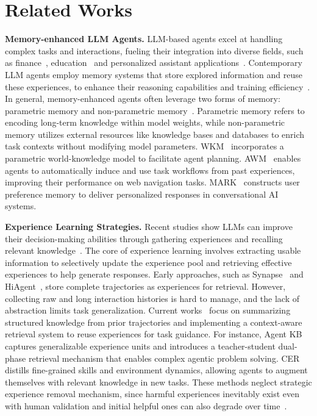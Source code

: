 \documentclass[11pt]{article}
\begin{document}
\section{Related Works}
\textbf{Memory-enhanced LLM Agents.} 
LLM-based agents excel at handling complex tasks and interactions, fueling their integration into diverse fields, such as finance~\citep{ding2024large}, education~\citep{wang2024large} and personalized assistant applications~\citep{abbasian2023conversational}.
Contemporary LLM agents employ memory systems that store explored information and reuse these experiences, to enhance their reasoning capabilities and training efficiency~\citep{mei2025survey}.
In general, memory-enhanced agents often leverage two forms of memory: parametric memory and non-parametric memory~\citep{zhang2024survey}. 
Parametric memory refers to encoding long-term knowledge within model weights, while non-parametric memory utilizes external resources like knowledge bases and databases to enrich task contexts without modifying model parameters.
WKM~\citep{qiao2024agent} incorporates a parametric world-knowledge model to facilitate agent planning. 
AWM~\citep{wang2025agent} enables agents to automatically induce and use task workflows from past experiences, improving their performance on web navigation tasks.
MARK~\citep{ganguli2025mark} constructs user preference memory to deliver personalized responses in conversational AI systems.


\noindent
\textbf{Experience Learning Strategies.}
Recent studies show LLMs can improve their decision-making abilities through gathering experiences and recalling relevant knowledge~\citep{zhao2024expel,tan-etal-2025-prospect}. 
The core of experience learning involves extracting usable information to selectively update the experience pool and retrieving effective experiences to help generate responses. 
Early approaches, such as Synapse~\citep{zheng2023synapse} and HiAgent~\citep{hu2024hiagent}, store complete trajectories as experiences for retrieval. 
However, collecting raw and long interaction histories is hard to manage, and the lack of abstraction limits task generalization. 
Current works~\citep{wang2025agent,chen2025swe} focus on summarizing structured knowledge from prior trajectories and implementing a context-aware retrieval system to reuse experiences for task guidance. 
For instance, Agent KB~\citep{tang2025agentkb} captures generalizable experience units and introduces a teacher-student dual-phase retrieval mechanism that enables complex agentic problem solving. 
CER~\citep{liu-etal-2025-contextual} distills fine-grained skills and environment dynamics, allowing agents to augment themselves with relevant knowledge in new tasks. 
These methods %
neglect strategic experience removal mechanism, since harmful experiences inevitably exist even with human validation and initial helpful ones can also degrade over time~\citep{xiong2025memory}. 
\end{document}
